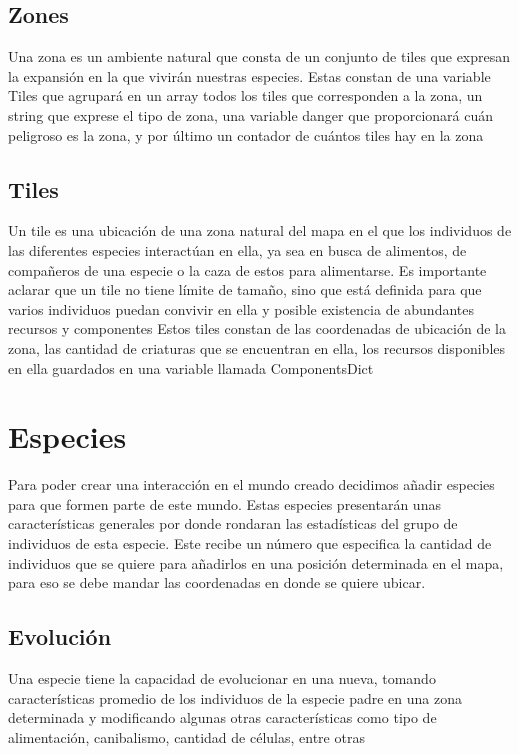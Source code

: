 \documentclass{llncs}
\begin{document}
\subsection{Zones}
Una zona es un ambiente natural que consta de un conjunto de tiles que expresan la expansión en la que vivirán nuestras especies.
\newline
\newline
Estas constan de una variable Tiles que agrupará en un array todos los tiles que corresponden a la zona, un string que exprese el tipo de zona, una variable danger que proporcionará cuán peligroso es la zona, y por último un contador de cuántos tiles hay en la zona


\subsection{Tiles}
Un tile es una ubicación de una zona natural del mapa en el que los individuos de las diferentes especies interactúan en ella, ya sea en busca de alimentos, de compañeros de una especie o la caza de estos para alimentarse. Es importante aclarar que un tile no tiene límite de tamaño, sino que está definida para que varios individuos puedan convivir en ella y posible existencia de abundantes recursos y componentes
\newline
\newline
Estos tiles constan de las coordenadas de ubicación de la zona, las cantidad de criaturas que se encuentran en ella, los recursos disponibles en ella guardados en una variable llamada ComponentsDict

\section{Especies}
Para poder crear una interacción en el mundo creado decidimos añadir especies para que formen parte de este mundo. Estas especies presentarán unas características generales por donde rondaran las estadísticas del grupo de individuos de esta especie.
\newline
\newline
Este recibe un número que especifica la cantidad de individuos que se quiere para añadirlos en una posición determinada en el mapa, para eso se debe mandar las coordenadas en donde se quiere ubicar. 


\subsection{Evolución}
Una especie tiene la capacidad de evolucionar en una nueva, tomando características promedio de los individuos de la especie padre en una zona determinada y modificando algunas otras características como tipo de alimentación, canibalismo, cantidad de células, entre otras
\end{document}

